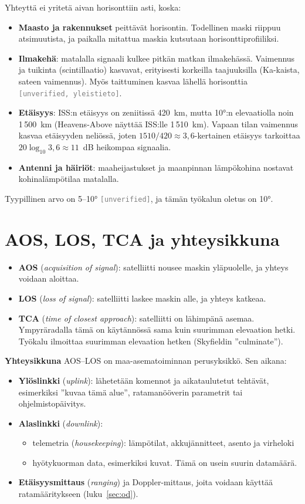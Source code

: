 \documentclass[a4paper,11pt]{article}
\newcommand{\unverified}[1][]{\textcolor{gray}{\texttt{[unverified#1]}}}
\begin{document}
Yhteyttä ei yritetä aivan horisonttiin asti, koska:
\begin{itemize}
  \item \textbf{Maasto ja rakennukset} peittävät horisontin. Todellinen maski riippuu atsimuutista, ja paikalla mitattua maskia kutsutaan horisonttiprofiiliksi.
  \item \textbf{Ilmakehä}: matalalla signaali kulkee pitkän matkan ilmakehässä. Vaimennus ja tuikinta (scintillaatio) kasvavat, erityisesti korkeilla taajuuksilla (Ka-kaista, sateen vaimennus). Myös taittuminen kasvaa lähellä horisonttia \unverified[, yleistieto].
  \item \textbf{Etäisyys}: ISS:n etäisyys on zeniitissä 420~km, mutta 10°:n elevaatiolla noin 1\,500~km (Heavens-Above näyttää ISS:lle 1\,510~km). Vapaan tilan vaimennus kasvaa etäisyyden neliössä, joten $1510/420 \approx 3,6$-kertainen etäisyys tarkoittaa $20\log_{10}3,6 \approx 11$~dB heikompaa signaalia.
  \item \textbf{Antenni ja häiriöt}: maaheijastukset ja maanpinnan lämpökohina nostavat kohinalämpötilaa matalalla.
\end{itemize}
Tyypillinen arvo on 5–10° \unverified, ja tämän työkalun oletus on 10°.

\section{AOS, LOS, TCA ja yhteysikkuna}

\begin{itemize}
  \item \textbf{AOS} (\emph{acquisition of signal}): satelliitti nousee maskin yläpuolelle, ja yhteys voidaan aloittaa.
  \item \textbf{LOS} (\emph{loss of signal}): satelliitti laskee maskin alle, ja yhteys katkeaa.
  \item \textbf{TCA} (\emph{time of closest approach}): satelliitti on lähimpänä asemaa. Ympyräradalla tämä on käytännössä sama kuin suurimman elevaation hetki. Työkalu ilmoittaa suurimman elevaation hetken (Skyfieldin ”culminate”).
\end{itemize}

\textbf{Yhteysikkuna} AOS–LOS on maa-asematoiminnan perusyksikkö. Sen aikana:
\begin{itemize}
  \item \textbf{Ylöslinkki} (\emph{uplink}): lähetetään komennot ja aikataulutetut tehtävät, esimerkiksi ”kuvaa tämä alue”, ratamanööverin parametrit tai ohjelmistopäivitys.
  \item \textbf{Alaslinkki} (\emph{downlink}):
  \begin{itemize}
    \item telemetria (\emph{housekeeping}): lämpötilat, akkujännitteet, asento ja virheloki
    \item hyötykuorman data, esimerkiksi kuvat. Tämä on usein suurin datamäärä.
  \end{itemize}
  \item \textbf{Etäisyysmittaus} (\emph{ranging}) ja Doppler-mittaus, joita voidaan käyttää ratamääritykseen (luku~\ref{sec:od}).
\end{itemize}
\end{document}
